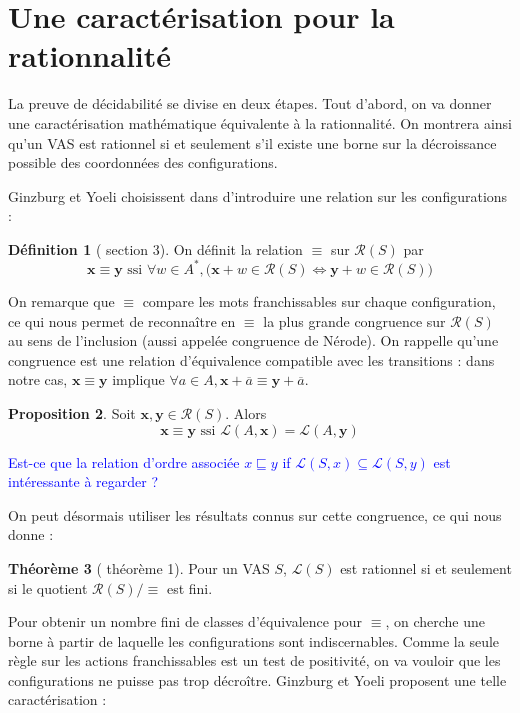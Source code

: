\documentclass[a4paper,final]{article}
\theoremstyle{definition}
\newtheorem{Theorem}{Théorème}
\newtheorem{Definition}[Theorem]{Définition}
\newtheorem{Proposition}[Theorem]{Proposition}
\newcommand{\alain}[1]{\textcolor{blue}{#1}}
\newcommand{\lang}{\ensuremath{\mathcal{L}}}
\newcommand{\vect}[1]{\ensuremath{\mathbf{#1}}}
\newcommand{\conf}[1]{\ensuremath{\mathcal{R}(#1)}}
\newcommand{\rel}{\ensuremath{\equiv}}
\newcommand{\ssi}{\ensuremath{\text{ ssi }}}
\newcommand{\equivaut}{\ensuremath{\Leftrightarrow}}
\newcommand{\valeur}[1]{\ensuremath{\overline{#1}}}
\begin{document}

\section{Une caractérisation pour la rationnalité}

La preuve de décidabilité se divise en deux étapes.
Tout d'abord, on va donner une caractérisation mathématique équivalente à la rationnalité.
On montrera ainsi qu'un VAS est rationnel si et seulement s'il existe une borne sur la décroissance possible des coordonnées des configurations.

Ginzburg et Yoeli choisissent dans \cite{giyo80} d'introduire une relation sur les configurations :

\begin{Definition}[\cite{giyo80} section 3]
On définit la relation $\rel$ sur $\conf{S}$ par
$$\vect{x}\rel\vect{y} \ssi \forall w\in A^\ast, \Big( \vect{x}+w\in\conf{S} \equivaut \vect{y}+w\in\conf{S} \Big)$$
\end{Definition}

On remarque que $\rel$ compare les mots franchissables sur chaque configuration, ce qui nous permet de reconnaître en $\rel$ la plus grande congruence sur $\conf{S}$ au sens de l'inclusion (aussi appelée congruence de Nérode).
On rappelle qu'une congruence est une relation d'équivalence compatible avec les transitions : 
dans notre cas, $\vect{x}\rel\vect{y}$ implique $\forall a\in A, \vect{x}+\valeur{a} \rel \vect{y}+\valeur{a}$.

\begin{Proposition}
Soit $\vect{x},\vect{y}\in\conf{S}$.
Alors
$$\vect{x}\rel\vect{y} \ssi \lang(A,\vect{x})=\lang(A,\vect{y})$$
\end{Proposition}

\alain{Est-ce que la relation d'ordre associée $x \sqsubseteq  y$ if $\lang(S,x) \subseteq \lang(S,y)$ est intéressante à regarder ?}

On peut désormais utiliser les résultats connus sur cette congruence, ce qui nous donne :

\begin{Theorem}[\cite{giyo80} théorème 1]
    Pour un VAS $S$, $\lang(S)$ est rationnel si et seulement si le quotient $\conf{S}/\rel$ est fini.
\end{Theorem}

Pour obtenir un nombre fini de classes d'équivalence pour $\rel$, on cherche une borne à partir de laquelle les configurations sont indiscernables.
Comme la seule règle sur les actions franchissables est un test de positivité, on va vouloir que les configurations ne puisse pas trop décroître.
Ginzburg et Yoeli proposent une telle caractérisation :
\end{document}
